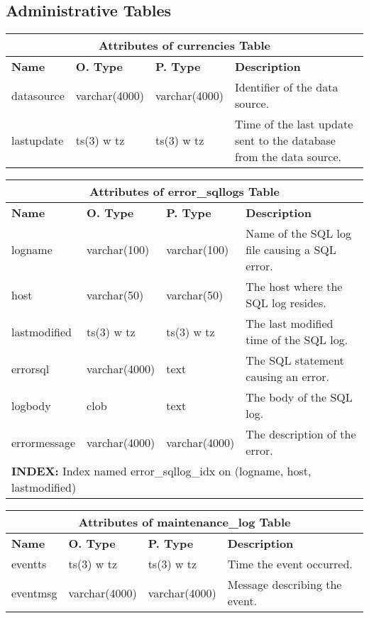 \subsection{Administrative Tables}
\begin{center}
  \begin{tabular}{|l|l|l|p{3.3in}|}\hline
    \multicolumn{4}{|c|}{\textbf{Attributes of currencies Table}}\\ \hline
    \textbf{Name} & \textbf{O. Type} & \textbf{P. Type} & \textbf{Description}\\ \hline
    datasource & varchar(4000) & varchar(4000) & Identifier of the data source.\\ \hline
    lastupdate & ts(3) w tz & ts(3) w tz & Time of the last update sent to the database from the data source.\\ \hline
  \end{tabular}
\vspace{24pt}

  \begin{tabular}{|l|l|l|p{3.2in}|}\hline
    \multicolumn{4}{|c|}{\textbf{Attributes of error\_sqllogs Table}}\\ \hline
    \textbf{Name} & \textbf{O. Type} & \textbf{P. Type} & \textbf{Description}\\ \hline
    logname & varchar(100) & varchar(100) & Name of the {SQL} log file causing a {SQL} error. \\ \hline
    host & varchar(50) & varchar(50) & The host where the {SQL} log resides.\\ \hline
    lastmodified & ts(3) w tz & ts(3) w tz & The last modified time of the {SQL} log. \\ \hline
    errorsql & varchar(4000) & text & The {SQL} statement causing an error.\\ \hline
    logbody & clob & text & The body of the {SQL} log.\\ \hline
    errormessage & varchar(4000) & varchar(4000) & The description of the error.\\
    \multicolumn{4}{|l|}{\textbf{INDEX:} Index named error\_sqllog\_idx on (logname, host, lastmodified)}\\ \hline
  \end{tabular}
\vspace{24pt}

  \begin{tabular}{|l|l|l|p{3.4in}|}\hline
    \multicolumn{4}{|c|}{\textbf{Attributes of maintenance\_log Table}}\\ \hline
    \textbf{Name} & \textbf{O. Type} & \textbf{P. Type} & \textbf{Description}\\ \hline
    eventts & ts(3) w tz & ts(3) w tz & Time the event occurred.\\ \hline
    eventmsg & varchar(4000) & varchar(4000) & Message describing the event.\\ \hline
  \end{tabular}
\vspace{24pt}


\end{center}
